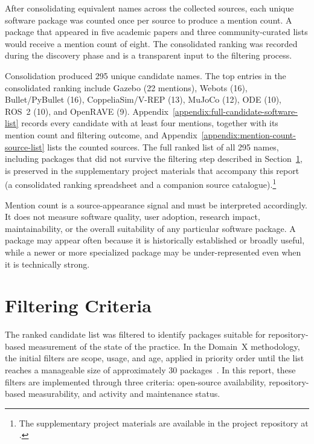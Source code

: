 After consolidating equivalent names across the collected sources, each unique software package was counted once per source to produce a mention count. A package that appeared in five academic papers and three community-curated lists would receive a mention count of eight. The consolidated ranking was recorded during the discovery phase and is a transparent input to the filtering process.

Consolidation produced 295 unique candidate names. The top entries in the consolidated ranking include Gazebo (22 mentions), Webots (16), Bullet/PyBullet (16), CoppeliaSim/V-REP (13), MuJoCo (12), ODE (10), ROS~2 (10), and OpenRAVE (9). Appendix~\ref{appendix:full-candidate-software-list} records every candidate with at least four mentions, together with its mention count and filtering outcome, and Appendix~\ref{appendix:mention-count-source-list} lists the counted sources. The full ranked list of all 295 names, including packages that did not survive the filtering step described in Section~\ref{sec:filtering-criteria}, is preserved in the supplementary project materials that accompany this report (a consolidated ranking spreadsheet and a companion source catalogue).\footnote{The supplementary project materials are available in the project repository at \suppurl.}

Mention count is a source-appearance signal and must be interpreted accordingly. It does not measure software quality, user adoption, research impact, maintainability, or the overall suitability of any particular software package. A package may appear often because it is historically established or broadly useful, while a newer or more specialized package may be under-represented even when it is technically strong.

\section{Filtering Criteria}
\label{sec:filtering-criteria}

The ranked candidate list was filtered to identify packages suitable for repository-based measurement of the state of the practice. In the Domain~X methodology, the initial filters are scope, usage, and age, applied in priority order until the list reaches a manageable size of approximately 30 packages~\citep{Smith2021}. In this report, these filters are implemented through three criteria: open-source availability, repository-based measurability, and activity and maintenance status.


